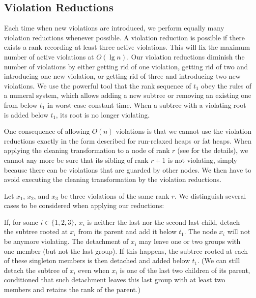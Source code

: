 \documentclass{llncs}
\begin{document}
\subsection*{Violation Reductions}

Each time when new violations are introduced, we perform equally many
violation reductions whenever possible. A violation reduction is
possible if there exists a rank recording at least three active
violations. This will fix the maximum number of active violations at
$O(\lg n)$. Our violation reductions diminish the number of violations
by either getting rid of one violation, getting rid of two and
introducing one new violation, or getting rid of three and introducing
two new violations.  We use the powerful tool that the rank sequence
of $t_1$ obey the rules of a numeral system, which allows adding a new
subtree or removing an existing one from below $t_1$ in worst-case
constant time.  When a subtree with a violating root is added below
$t_1$, its root is no longer violating.

One consequence of allowing $O(n)$ violations is that we cannot use
the violation reductions exactly in the form described for run-relaxed
heaps or fat heaps.  When applying the cleaning transformation
to a node of rank $r$ (see \cite{DGST88} for the details), we cannot
any more be sure that its sibling of rank $r+1$ is not
violating, simply because there can be violations that are guarded by other nodes.  
We then have to avoid executing the cleaning transformation by the violation reductions.
 
Let $x_1$, $x_2$, and $x_3$ be three violations of the same rank $r$. 
We distinguish several cases to be considered when applying our reductions:

\begin{description}
\vspace{-.1in}
\item[Case 1.] If, for some $i \in\{1,2,3\}$, $x_i$ is neither the last nor the 
	second-last child, detach the subtree rooted at $x_i$ from its parent and add it below $t_1$. 
	The node $x_i$ will not be anymore violating. The detachment of $x_i$ may leave one or two groups with one member (but not the last group).
	If this happens, the subtree rooted at each of these singleton members is then detached and added below $t_1$.
	(We can still detach the subtree of $x_i$ even when $x_i$ is one of the last two children of its parent,
	conditioned that such detachment leaves this last group with at least two members and retains the rank of the parent.) 
\end{description}
\end{document}
